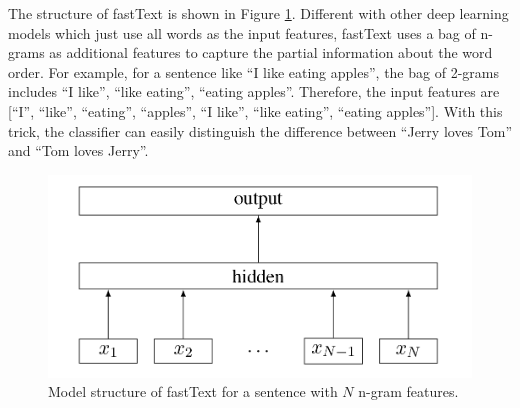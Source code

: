 The structure of fastText is shown in Figure \ref{fasttext_structure}. Different with other deep learning models which just use all words as the input features, fastText uses a bag of n-grams as additional features to capture the partial information about the word order. For example, for a sentence like ``I like eating apples'', the bag of 2-grams includes ``I like'', ``like eating'', ``eating apples''. Therefore, the input features are [``I'', ``like'', ``eating'', ``apples'', ``I like'', ``like eating'', ``eating apples'']. With this trick, the classifier can easily distinguish the difference between ``Jerry loves Tom'' and ``Tom loves Jerry''.

\begin{figure}
\centering
\caption{Model structure of fastText for a sentence with $N$ n-gram features.}
\label{fasttext_structure}
\includegraphics{fasttext_structure.png}

\end{figure}

